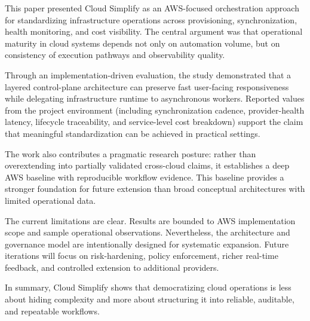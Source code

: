 This paper presented Cloud Simplify as an AWS-focused orchestration approach for standardizing infrastructure operations across provisioning, synchronization, health monitoring, and cost visibility. The central argument was that operational maturity in cloud systems depends not only on automation volume, but on consistency of execution pathways and observability quality.

Through an implementation-driven evaluation, the study demonstrated that a layered control-plane architecture can preserve fast user-facing responsiveness while delegating infrastructure runtime to asynchronous workers. Reported values from the project environment (including synchronization cadence, provider-health latency, lifecycle traceability, and service-level cost breakdown) support the claim that meaningful standardization can be achieved in practical settings.

The work also contributes a pragmatic research posture: rather than overextending into partially validated cross-cloud claims, it establishes a deep AWS baseline with reproducible workflow evidence. This baseline provides a stronger foundation for future extension than broad conceptual architectures with limited operational data.

The current limitations are clear. Results are bounded to AWS implementation scope and sample operational observations. Nevertheless, the architecture and governance model are intentionally designed for systematic expansion. Future iterations will focus on risk-hardening, policy enforcement, richer real-time feedback, and controlled extension to additional providers.

In summary, Cloud Simplify shows that democratizing cloud operations is less about hiding complexity and more about structuring it into reliable, auditable, and repeatable workflows.

